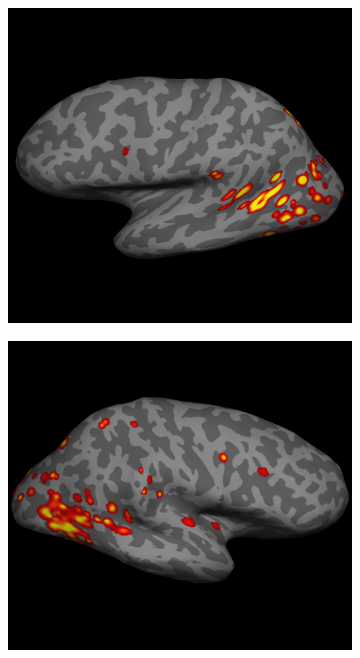 \documentclass[5p,authoryear]{elsarticle}
\begin{document}
\begin{figure}[p]
\centering
\begin{subfigure}{0.3\textwidth}
\centering
\includegraphics[width=\textwidth]{figures/s1-lh-lateral-sensitivity}
\caption{}
\label{fig:s1-lh-lateral-sensitivity}
\end{subfigure}
\begin{subfigure}{0.3\textwidth}
\centering
\includegraphics[width=\textwidth]{figures/s2-rh-lateral-sensitivity}

\end{subfigure}
\end{figure}
\end{document}
